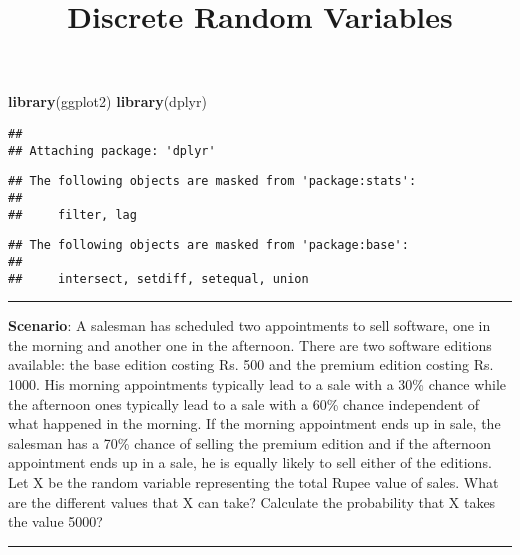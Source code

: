 \documentclass[
]{article}
\title{Discrete Random Variables}
\author{}
\date{\vspace{-2.5em}}
\newenvironment{Shaded}{\begin{snugshade}}{\end{snugshade}}
\newcommand{\FunctionTok}[1]{\textcolor[rgb]{0.13,0.29,0.53}{\textbf{#1}}}
\newcommand{\NormalTok}[1]{#1}
\begin{document}
\maketitle

\begin{Shaded}
\begin{Highlighting}[]
\FunctionTok{library}\NormalTok{(ggplot2)}
\FunctionTok{library}\NormalTok{(dplyr)}
\end{Highlighting}
\end{Shaded}

\begin{verbatim}
## 
## Attaching package: 'dplyr'
\end{verbatim}

\begin{verbatim}
## The following objects are masked from 'package:stats':
## 
##     filter, lag
\end{verbatim}

\begin{verbatim}
## The following objects are masked from 'package:base':
## 
##     intersect, setdiff, setequal, union
\end{verbatim}

\begin{center}\rule{0.5\linewidth}{0.5pt}\end{center}

\textbf{Scenario}: A salesman has scheduled two appointments to sell
software, one in the morning and another one in the afternoon. There are
two software editions available: the base edition costing Rs. 500 and
the premium edition costing Rs. 1000. His morning appointments typically
lead to a sale with a 30\% chance while the afternoon ones typically
lead to a sale with a 60\% chance independent of what happened in the
morning. If the morning appointment ends up in sale, the salesman has a
70\% chance of selling the premium edition and if the afternoon
appointment ends up in a sale, he is equally likely to sell either of
the editions. Let X be the random variable representing the total Rupee
value of sales. What are the different values that X can take? Calculate
the probability that X takes the value 5000?

\begin{center}\rule{0.5\linewidth}{0.5pt}\end{center}
\end{document}
